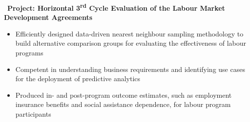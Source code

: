 \documentclass[12pt,a4paper,roman]{moderncv}        %
\begin{document}
\bigskip

\faBook \, \textbf{Project: Horizontal 3\textsuperscript{rd} Cycle Evaluation of the Labour Market Development Agreements}
\begin{itemize}%
        \item Efficiently designed data-driven nearest neighbour sampling methodology to build alternative comparison groups for evaluating the effectiveness of labour programs
        \item Competent in understanding business requirements and identifying use cases for the deployment of predictive analytics
        \item Produced in- and post-program outcome estimates, such as employment insurance benefits and social assistance dependence, for labour program participants
\end{itemize}
\bigskip
\end{document}
